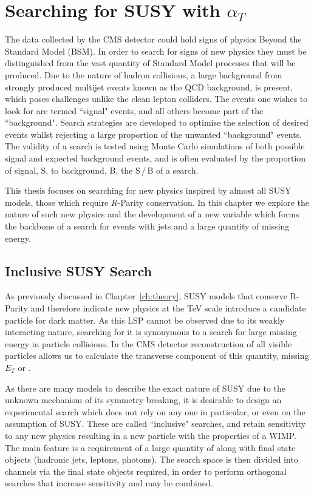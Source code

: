\chapter{Searching for SUSY with $\alpha_{T}$}
\label{ch:at}

The data collected by the CMS detector could hold signs of physics Beyond the Standard Model (BSM). In order to search for signs of new physics they must be distinguished from the vast quantity of Standard Model processes that will be produced. Due to the nature of hadron collisions, a large background from strongly produced multijet events known as the QCD background, is present, which poses challenges unlike the clean lepton colliders. The events one wishes to look for are termed ``signal" events, and all others become part of the ``background". Search strategies are developed to optimise the selection of desired events whilst rejecting a large proportion of the unwanted ``background" events. The validity of a search is tested using Monte Carlo simulations of both possible signal and expected background events, and is often evaluated by the proportion of signal, S, to background, B, the S\,/\,B of a search. 

This thesis focuses on searching for new physics inspired by almost all SUSY models, those which require $R$-Parity conservation. In this chapter we explore the nature of such new physics and the development of a new variable \alt which forms the backbone of a search for events with jets and a large quantity of missing energy. 

\section{Inclusive SUSY Search}

As previously discussed in Chapter~\ref{ch:theory}, SUSY models that conserve R-Parity and therefore indicate new physics at the TeV scale introduce a candidate particle for dark matter. As this LSP cannot be observed due to its weakly interacting nature, searching for it is synonymous to a search for large missing energy in particle collisions. In the CMS detector reconstruction of all visible particles allows us to calculate the transverse component of this quantity, missing $E_{T}$ or \met. 

As there are many models to describe the exact nature of SUSY due to the unknown mechanism of its symmetry breaking, it is desirable to design an experimental search which does not rely on any one in particular, or even on the assumption of SUSY. These are called ``inclusive" searches, and retain sensitivity to any new physics resulting in a new particle with the properties of a WIMP. The main feature is a requirement of a large quantity of \met along with final state objects (hadronic jets, leptons, photons). The search space is then divided into channels via the final state objects required, in order to perform orthogonal searches that increase sensitivity and may be combined.

